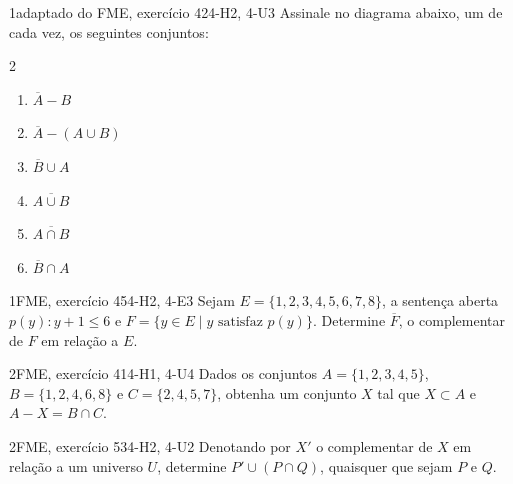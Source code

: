 \begin{questao}{1}{adaptado do FME, exercício 42}{4-H2, 4-U3}\label{u4:fme42}
Assinale no diagrama abaixo, um de cada vez, os seguintes conjuntos:
\begin{multicols}{2}
\begin{enumerate}[label=\alph*)]
  \item $\overline{A}-B$
  \item $\overline{A}-(A\cup B)$
  \item $\overline{B}\cup A$
  \item $\overline{A\cup B}$
  \item $\overline{A\cap B}$
  \item $\overline{B}\cap A$
\end{enumerate}
\end{multicols}
\begin{center}
\end{center}
\end{questao}

\begin{questao}[integradora]{1}{FME, exercício 45}{4-H2, 4-E3}\label{u4:fme45}
Sejam $E=\{1,2,3,4,5,6,7,8\}$, a sentença aberta $p(y)\colon y+1\le 6$ e $F=\{y\in E\mid y \text{ satisfaz } p(y)\}$. Determine $\overline{F}$, o complementar de $F$ em relação a $E$.
\end{questao}

\begin{questao}{2}{FME, exercício 41}{4-H1, 4-U4}\label{u4:fme41}
Dados os conjuntos $A=\{1,2,3,4,5\}$, $B=\{1,2,4,6,8\}$ e $C=\{2,4,5,7\}$, obtenha um conjunto $X$ tal que $X\subset A$ e $A-X=B\cap C$.
\end{questao}

\begin{questao}{2}{FME, exercício 53}{4-H2, 4-U2}\label{u4:fme53}
Denotando por $X'$ o complementar de $X$ em relação a um universo $U$, determine $P'\cup(P\cap Q)$, quaisquer que sejam $P$ e $Q$.
\end{questao}

